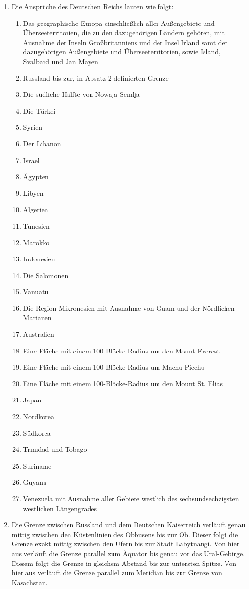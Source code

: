 \documentclass{article}
\begin{document}
\begin{enumerate}[(1)]
    \item Die Ansprüche des Deutschen Reichs lauten wie folgt:
    \begin{enumerate}[1.]
        \item Das geographische Europa einschließlich aller Außengebiete und Überseeterritorien, die zu den dazugehörigen Ländern gehören, mit Ausnahme der Inseln Großbritanniens und der Insel Irland samt der dazugehörigen Außengebiete und Überseeterritorien, sowie Island, Svalbard und Jan Mayen
        \item Russland bis zur, in Absatz 2 definierten Grenze
        \item Die südliche Hälfte von Nowaja Semlja
        \item Die Türkei
        \item Syrien
        \item Der Libanon
        \item Israel
        \item Ägypten
        \item Libyen
        \item Algerien
        \item Tunesien
        \item Marokko
        \item Indonesien
        \item Die Salomonen
        \item Vanuatu
        \item Die Region Mikronesien mit Ausnahme von Guam und der Nördlichen Marianen
        \item Australien
        \item Eine Fläche mit einem 100-Blöcke-Radius um den Mount Everest
        \item Eine Fläche mit einem 100-Blöcke-Radius um Machu Picchu
        \item Eine Fläche mit einem 100-Blöcke-Radius um den Mount St. Elias
        \item Japan
        \item Nordkorea
        \item Südkorea
        \item Trinidad und Tobago
        \item Suriname
        \item Guyana
        \item Venezuela mit Ausnahme aller Gebiete westlich des sechsundsechzigsten westlichen Längengrades
    \end{enumerate}
    \item Die Grenze zwischen Russland und dem Deutschen Kaiserreich verläuft genau mittig zwischen den Küstenlinien des Obbusens bis zur Ob. Dieser folgt die Grenze exakt mittig zwischen den Ufern bis zur Stadt Labytnangi. Von hier aus verläuft die Grenze parallel zum Äquator bis genau vor das Ural-Gebirge. Diesem folgt die Grenze in gleichem Abstand bis zur untersten Spitze. Von hier aus verläuft die Grenze parallel zum Meridian bis zur Grenze von Kasachstan.    
\end{enumerate}
\end{document}
